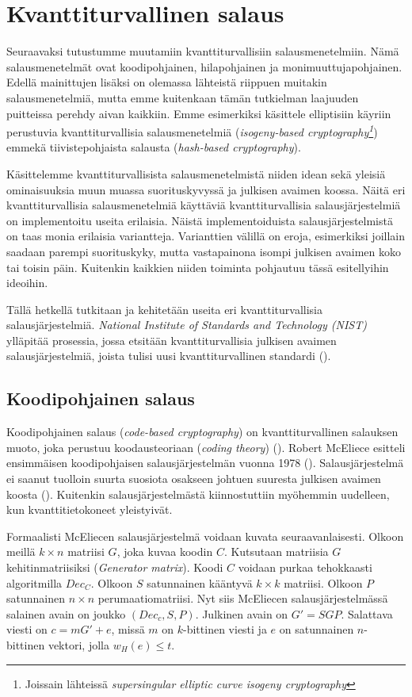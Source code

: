 \chapter{Kvanttiturvallinen salaus\label{results}}
Seuraavaksi tutustumme muutamiin kvanttiturvallisiin salausmenetelmiin. Nämä salausmenetelmät ovat koodipohjainen, hilapohjainen ja monimuuttujapohjainen. Edellä mainittujen lisäksi on olemassa lähteistä riippuen muitakin salausmenetelmiä, mutta emme kuitenkaan tämän tutkielman laajuuden puitteissa perehdy aivan kaikkiin. Emme esimerkiksi käsittele elliptisiin käyriin perustuvia kvanttiturvallisia salausmenetelmiä (\emph{isogeny-based cryptography\footnote{Joissain lähteissä \emph{supersingular elliptic curve isogeny cryptography}}}) emmekä tiivistepohjaista salausta (\emph{hash-based cryptography}).

Käsittelemme kvanttiturvallisista salausmenetelmistä niiden idean sekä yleisiä ominaisuuksia muun muassa suorituskyvyssä ja julkisen avaimen koossa. Näitä eri kvanttiturvallisia salausmenetelmiä käyttäviä kvanttiturvallisia salausjärjestelmiä on implementoitu useita erilaisia. Näistä implementoiduista salausjärjestelmistä on taas monia erilaisia variantteja. Varianttien välillä on eroja, esimerkiksi joillain saadaan parempi suorituskyky, mutta vastapainona isompi julkisen avaimen koko tai toisin päin. Kuitenkin kaikkien niiden toiminta pohjautuu tässä esitellyihin ideoihin.

Tällä hetkellä tutkitaan ja kehitetään useita eri kvanttiturvallisia salausjärjestelmiä. \emph{National Institute of Standards and Technology (NIST)} ylläpitää prosessia, jossa etsitään kvanttiturvallisia julkisen avaimen salausjärjestelmiä, joista tulisi uusi kvanttiturvallinen standardi (\cite{alagic2020status}).

\section{Koodipohjainen salaus}
Koodipohjainen salaus (\emph{code-based cryptography}) on kvanttiturvallinen salauksen muoto, joka perustuu koodausteoriaan (\emph{coding theory}) (\cite{repka2014overview}). Robert McEliece esitteli ensimmäisen koodipohjaisen salausjärjestelmän vuonna 1978 (\cite{8012331}). Salausjärjestelmä ei saanut tuolloin suurta suosiota osakseen johtuen suuresta julkisen avaimen koosta (\cite{repka2014overview}). Kuitenkin salausjärjestelmästä kiinnostuttiin myöhemmin uudelleen, kun kvanttitietokoneet yleistyivät.

Formaalisti McEliecen salausjärjestelmä voidaan kuvata seuraavanlaisesti. Olkoon meillä $k \times n$ matriisi $G$, joka kuvaa koodin $C$. Kutsutaan matriisia $G$ kehitinmatriisiksi (\emph{Generator matrix}). Koodi $C$ voidaan purkaa tehokkaasti algoritmilla $Dec_{C}$. Olkoon $S$ satunnainen kääntyvä $k \times k$ matriisi. Olkoon $P$ satunnainen $n \times n$ perumaatiomatriisi. Nyt siis McEliecen salausjärjestelmässä salainen avain on joukko $(Dec_{c}, S, P)$. Julkinen avain on $G' = SGP$. Salattava viesti on $c = mG'+e$, missä $m$ on $k$-bittinen viesti ja $e$ on satunnainen $n$-bittinen vektori, jolla $w_ {H}(e) \leq t$.

